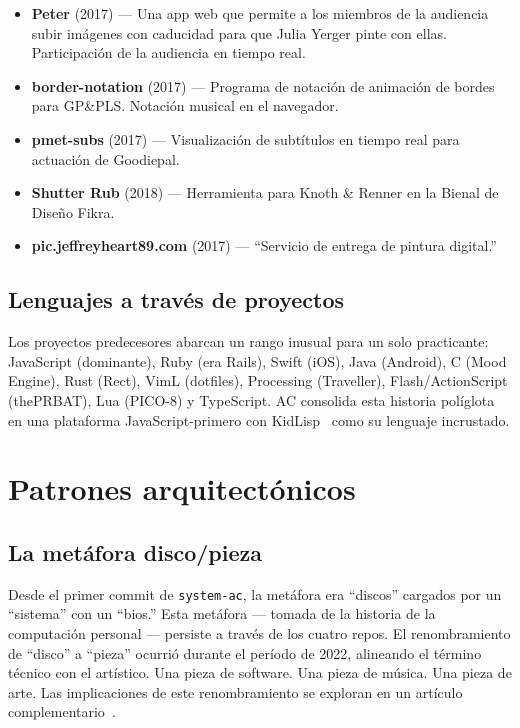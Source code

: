 \documentclass[10pt,letterpaper,twocolumn]{article}
\begin{document}
\begin{itemize}
  \item \textbf{Peter} (2017) --- Una app web que permite a los miembros de la audiencia subir imágenes con caducidad para que Julia Yerger pinte con ellas. Participación de la audiencia en tiempo real.
  \item \textbf{border-notation} (2017) --- Programa de notación de animación de bordes para GP\&PLS. Notación musical en el navegador.
  \item \textbf{pmet-subs} (2017) --- Visualización de subtítulos en tiempo real para actuación de Goodiepal.
  \item \textbf{Shutter Rub} (2018) --- Herramienta para Knoth \& Renner en la Bienal de Diseño Fikra.
  \item \textbf{pic.jeffreyheart89.com} (2017) --- ``Servicio de entrega de pintura digital.''
\end{itemize}

\subsection{Lenguajes a través de proyectos}

Los proyectos predecesores abarcan un rango inusual para un solo practicante: JavaScript (dominante), Ruby (era Rails), Swift (iOS), Java (Android), C (Mood Engine), Rust (Rect), VimL (dotfiles), Processing (Traveller), Flash/ActionScript (thePRBAT), Lua (PICO-8) y TypeScript. AC consolida esta historia políglota en una plataforma JavaScript-primero con KidLisp~\citep{scudder2026kidlisp} como su lenguaje incrustado.

\section{Patrones arquitectónicos}

\subsection{La metáfora disco/pieza}

Desde el primer commit de \texttt{system-ac}, la metáfora era ``discos'' cargados por un ``sistema'' con un ``bios.'' Esta metáfora --- tomada de la historia de la computación personal --- persiste a través de los cuatro repos. El renombramiento de ``disco'' a ``pieza'' ocurrió durante el período de 2022, alineando el término técnico con el artístico. Una pieza de software. Una pieza de música. Una pieza de arte. Las implicaciones de este renombramiento se exploran en un artículo complementario~\citep{scudder2026pieces}.
\end{document}
